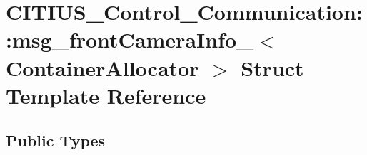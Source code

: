 \hypertarget{struct_c_i_t_i_u_s___control___communication_1_1msg__front_camera_info__}{\section{\-C\-I\-T\-I\-U\-S\-\_\-\-Control\-\_\-\-Communication\-:\-:msg\-\_\-front\-Camera\-Info\-\_\-$<$ \-Container\-Allocator $>$ \-Struct \-Template \-Reference}
\label{struct_c_i_t_i_u_s___control___communication_1_1msg__front_camera_info__}
}
\subsection*{\-Public \-Types}
